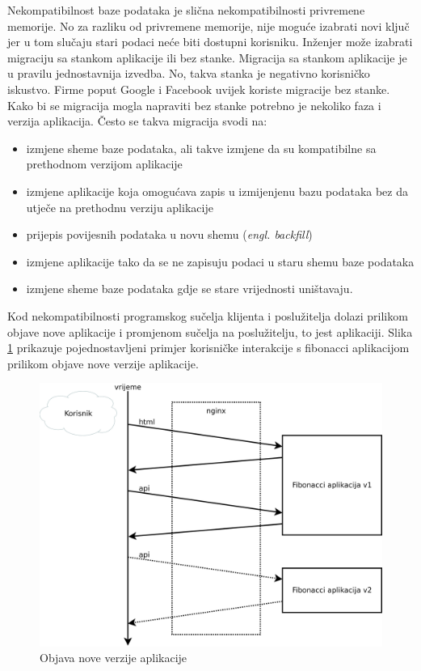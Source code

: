 Nekompatibilnost baze podataka je slična nekompatibilnosti privremene memorije. No za razliku od
privremene memorije, nije moguće izabrati novi ključ jer u tom slučaju stari podaci neće biti
dostupni korisniku. Inženjer može izabrati migraciju sa stankom aplikacije ili bez stanke. Migracija
sa stankom aplikacije je u pravilu jednostavnija izvedba. No, takva stanka je negativno korisničko
iskustvo. Firme poput Google i Facebook uvijek koriste migracije bez stanke. Kako bi se migracija
mogla napraviti bez stanke potrebno je nekoliko faza i verzija aplikacija. Često se takva migracija
svodi na:
\begin{itemize}
    \item izmjene sheme baze podataka, ali takve izmjene da su kompatibilne sa prethodnom verzijom
        aplikacije
    \item izmjene aplikacije koja omogućava zapis u izmijenjenu bazu podataka bez da utječe na
        prethodnu verziju aplikacije
    \item prijepis povijesnih podataka u novu shemu (\textit{engl. backfill})
    \item izmjene aplikacije tako da se ne zapisuju podaci u staru shemu baze podataka
    \item izmjene sheme baze podataka gdje se stare vrijednosti uništavaju.
\end{itemize}

Kod nekompatibilnosti programskog sučelja klijenta i poslužitelja dolazi prilikom objave nove
aplikacije i promjenom sučelja na poslužitelju, to jest aplikaciji. Slika \ref{fig:04request_flow}
prikazuje pojednostavljeni primjer korisničke interakcije s fibonacci aplikacijom prilikom objave
nove verzije aplikacije.

\begin{figure}[h]
    \centering
    \includegraphics[width=\textwidth]{img/04/request_flow.png}
    \caption{Objava nove verzije aplikacije}%
    \label{fig:04request_flow}
\end{figure}

